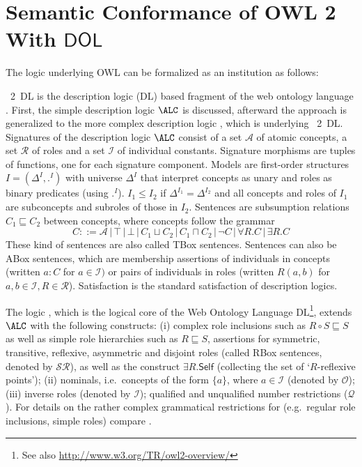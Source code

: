 \documentclass[10pt,fleqn,final]{scrreprt}
\makeatletter
\newcommand*\CommentAuthor{}
\renewcommand*\CommentAuthor{#1}}
\newcommand*\CommentDate{}
\renewcommand*\CommentDate{#1}}
\newcommand*\CommentId{}
\renewcommand*\CommentId{#1}}
\newcommand*\CommentType{}
\renewcommand*\CommentType{#1}}
\newcommand*{\SetCommentColorByType}[1]{%
\edef\localType{{#1}}%
\expandafter\ifstrequal\localType{q-aut}{\colorlet{CommentColor}{red}}{%
\expandafter\ifstrequal\localType{q-all}{\colorlet{CommentColor}{orange}}{%
\expandafter\ifstrequal\localType{todo}{\colorlet{CommentColor}{orange}}{%
\expandafter\ifstrequal\localType{fyi}{\colorlet{CommentColor}{lightgray}}{%
\colorlet{CommentColor}{yellow}}}}}}
\newcommand*{\SetCommentPrefixByType}[1]{%
\edef\localType{{#1}}%
\expandafter\@ifmtarg\localType{%
\edef\CommentPrefix{}%
}{%
\caseupper[q]{#1}%
\edef\CommentPrefix{\thestring: }%
}}
\newcommand*{\initComment}[1]{%
\setkeys{Comment}{#1}%
\SetCommentColorByType{\CommentType}%
\relax%
\SetCommentPrefixByType{\CommentType}%
\relax%
}
\newcommand*{\todonote}[2][]{%
\initComment{#1}%
\pdfcomment[author=\CommentAuthor,color=CommentColor,date=\CommentDate,id=\CommentId]{%
\CommentPrefix
#2}}
\renewcommand*{\todonote}[2][]{%
\initComment{#1}%
\ednote{\CommentPrefix #2}}
\newcommand*{\CLnote}[2][author=Christoph Lange]{%
\todonote[author=Christoph Lange,#1]{#2} 
}
\newcommand*{\DOL}{\ensuremath{\mathsf{DOL}}\xspace}
\providecommand{\DIFaddbegin}{} %
\providecommand{\DIFaddend}{} %
\providecommand{\DIFdelbegin}{} %
\providecommand{\DIFdelend}{} %
\makeatother
\begin{document}
\DIFdelbegin %
\DIFdelend \DIFaddbegin \section{Semantic Conformance of OWL 2 With \DOL}\DIFaddend \label{a:owl-logic}

 The logic \SROIQ underlying 
OWL can be formalized as an institution as follows:
\begin{definition}\label{DL}  
\OWL~2~DL is the description logic (DL) based fragment of the web ontology language \OWL. 
 First, the simple description logic $\ALC$ is discussed, afterward the approach is generalized
to the more complex description logic \SROIQ{}, which is underlying \OWL~2~DL.
Signatures of the description logic $\ALC$ consist of a set  ${\mathcal A}$ of
atomic concepts, a set ${\mathcal R}$ of roles and a set ${\mathcal
I}$ of individual constants. Signature morphisms are tuples of
functions, one for each signature component.
Models are  first-order structures $I = (\Delta^I, .^I)$ with universe $\Delta^I$
that interpret concepts as unary and roles as binary predicates
(using $.^I$). $I_1\leq I_2$ if $\Delta^{I_1}=\Delta^{I_2}$ and all
concepts and roles of $I_1$ are subconcepts and subroles of those in $I_2$.
Sentences are subsumption relations $C_1\sqsubseteq C_2$ between
concepts, where concepts follow the grammar
$$C ::= {\mathcal A} \,|\, \top\,|\, \bot \,|\, C_1 \sqcup C_2 \,|\, C_1 \sqcap C_2 \,|\, \neg C 
    \,|\, \forall R . C \,|\, \exists R . C$$
These kind of sentences are also called TBox sentences.
 Sentences can also be ABox sentences, which are
membership assertions of individuals in concepts (written $a:C$ for
$a\in{\mathcal I})$ or pairs of individuals in roles (written $R(a,b)$
for $a,b\in{\mathcal I}, R\in{\mathcal R}$).   Satisfaction is the
standard satisfaction of description logics.

The logic \SROIQ \cite{SROIQ}, which is the logical core of the Web Ontology
Language  DL\footnote{See also \url{http://www.w3.org/TR/owl2-overview/}}, extends $\ALC$
with the following constructs: (i) complex role inclusions such as $R \circ S \sqsubseteq S$
as well as simple role hierarchies such as $R \sqsubseteq S$,
assertions for symmetric, transitive, reflexive, asymmetric and
disjoint roles (called RBox sentences, denoted by $\mathcal{SR}$), as well as the construct
$\exists R . \mathsf{Self}$ (collecting the set of `$R$-reflexive
points'); (ii) nominals, i.e.\ concepts of the form $\{a\}$, where $a\in\mathcal{I}$ (denoted by $\mathcal{O}$); (iii) inverse
roles (denoted by $\mathcal{I}$); qualified and unqualified number
restrictions ($\mathcal{Q}$). For details on the rather complex
grammatical restrictions for \SROIQ (e.g.\ regular role inclusions,
simple roles) compare \cite{SROIQ}.


\end{definition}
\end{document}
